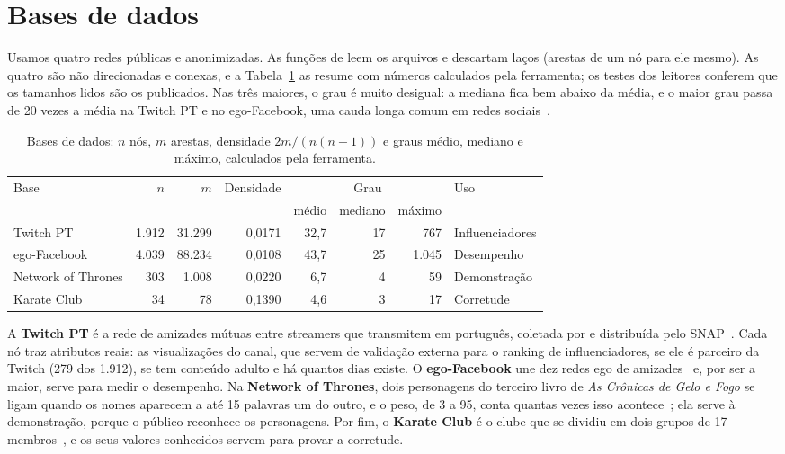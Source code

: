 \section{Bases de dados}\label{sec:bases}

Usamos quatro redes públicas e anonimizadas. As funções de  leem os
arquivos e descartam laços (arestas de um nó para ele mesmo). As quatro são não direcionadas e conexas, e a
Tabela~\ref{tab:bases} as resume com números calculados pela ferramenta; os testes dos leitores
conferem que os tamanhos lidos são os publicados. Nas três maiores, o grau é muito desigual: a
mediana fica bem abaixo da média, e o maior grau passa de 20 vezes a média na Twitch PT e no
ego-Facebook, uma cauda longa comum em redes sociais~\cite{newman2018}.

\begin{table}[htbp]
\centering
\caption{Bases de dados: $n$ nós, $m$ arestas, densidade $2m/(n(n-1))$ e graus médio, mediano e
máximo, calculados pela ferramenta.}
\label{tab:bases}
\small
\setlength{\tabcolsep}{4.5pt}
\begin{tabular}{@{}l r r r r r r l@{}}
\toprule
Base & $n$ & $m$ & Densidade & \multicolumn{3}{c}{Grau} & Uso \\
\cmidrule(lr){5-7}
 & & & & médio & mediano & máximo & \\
\midrule
Twitch PT & 1.912 & 31.299 & 0,0171 & 32,7 & 17 & 767 & Influenciadores \\
ego-Facebook & 4.039 & 88.234 & 0,0108 & 43,7 & 25 & 1.045 & Desempenho \\
Network of Thrones & 303 & 1.008 & 0,0220 & 6,7 & 4 & 59 & Demonstração \\
Karate Club & 34 & 78 & 0,1390 & 4,6 & 3 & 17 & Corretude \\
\bottomrule
\end{tabular}
\end{table}

A \textbf{Twitch PT} é a rede de amizades mútuas entre streamers que transmitem em português,
coletada por \cite{rozemberczki2021} e distribuída pelo SNAP~\cite{leskovec2014snap}. Cada nó traz
atributos reais: as visualizações do canal, que servem de validação externa para o ranking de
influenciadores, se ele é parceiro da Twitch (279 dos 1.912), se tem conteúdo adulto e há quantos
dias existe. O \textbf{ego-Facebook} une dez redes ego de amizades~\cite{mcauley2012} e, por ser a maior,
serve para medir o desempenho. Na \textbf{Network of
Thrones}, dois personagens do terceiro livro de \emph{As Crônicas de Gelo e Fogo} se ligam quando os
nomes aparecem a até 15 palavras um do outro, e o peso, de 3 a 95, conta quantas vezes isso
acontece~\cite{beveridge2016}; ela serve à demonstração, porque o público reconhece os personagens.
Por fim, o \textbf{Karate Club} é o clube que se dividiu em dois grupos de 17
membros~\cite{zachary1977}, e os seus valores conhecidos servem para provar a corretude.

